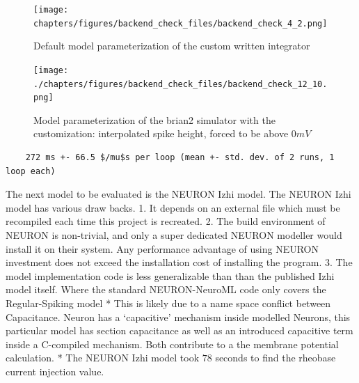 \begin{center}
\begin{figure}
\texttt{[image: chapters/figures/backend\_check\_files/backend\_check\_4\_2.png]}
\caption{Default model parameterization of the custom written integrator}
\end{figure}
\end{center}


\begin{center}
\begin{figure}

    \texttt{[image: ./chapters/figures/backend\_check\_files/backend\_check\_12\_10.png]}
\caption{Model parameterization of the brian2 simulator with the customization: interpolated spike height, forced to be above $0mV$}
\end{figure}

\end{center}
    
\begin{verbatim}
    272 ms +- 66.5 $/mu$s per loop (mean +- std. dev. of 2 runs, 1 loop each)
\end{verbatim}

The next model to be evaluated is the NEURON Izhi model. The NEURON Izhi model has various draw backs. 1. It depends on an external file which must be recompiled each time this project is recreated. 2. The build environment of NEURON is non-trivial, and only a super dedicated NEURON modeller would install it on their system. Any performance advantage of using NEURON investment does not exceed the installation cost of installing the program. 3. The model implementation code is less generalizable than than the published Izhi model itself. Where the standard NEURON-NeuroML code only covers the Regular-Spiking model * This is likely due to a name space conflict between Capacitance. Neuron has a `capacitive' mechanism inside modelled Neurons, this particular model has section capacitance as well as an introduced capacitive term inside a C-compiled mechanism. Both contribute to a the membrane
potential calculation. * The NEURON Izhi model took $78$ seconds to find the rheobase current injection value.
    


